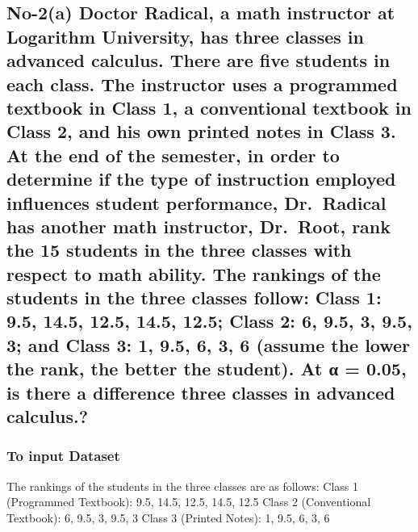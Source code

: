 \documentclass[
]{article}
\begin{document}
\subsection{No-2(a) Doctor Radical, a math instructor at Logarithm
University, has three classes in advanced calculus. There are five
students in each class. The instructor uses a programmed textbook in
Class 1, a conventional textbook in Class 2, and his own printed notes
in Class 3. At the end of the semester, in order to determine if the
type of instruction employed influences student performance, Dr.~Radical
has another math instructor, Dr.~Root, rank the 15 students in the three
classes with respect to math ability. The rankings of the students in
the three classes follow: Class 1: 9.5, 14.5, 12.5, 14.5, 12.5; Class 2:
6, 9.5, 3, 9.5, 3; and Class 3: 1, 9.5, 6, 3, 6 (assume the lower the
rank, the better the student). At α = 0.05, is there a difference three
classes in advanced
calculus.?}\label{no-2a-doctor-radical-a-math-instructor-at-logarithm-university-has-three-classes-in-advanced-calculus.-there-are-five-students-in-each-class.-the-instructor-uses-a-programmed-textbook-in-class-1-a-conventional-textbook-in-class-2-and-his-own-printed-notes-in-class-3.-at-the-end-of-the-semester-in-order-to-determine-if-the-type-of-instruction-employed-influences-student-performance-dr.-radical-has-another-math-instructor-dr.-root-rank-the-15-students-in-the-three-classes-with-respect-to-math-ability.-the-rankings-of-the-students-in-the-three-classes-follow-class-1-9.5-14.5-12.5-14.5-12.5-class-2-6-9.5-3-9.5-3-and-class-3-1-9.5-6-3-6-assume-the-lower-the-rank-the-better-the-student.-at-ux3b1-0.05-is-there-a-difference-three-classes-in-advanced-calculus.}

\subsubsection{To input Dataset}\label{to-input-dataset}

The rankings of the students in the three classes are as follows: Class
1 (Programmed Textbook): 9.5, 14.5, 12.5, 14.5, 12.5 Class 2
(Conventional Textbook): 6, 9.5, 3, 9.5, 3 Class 3 (Printed Notes): 1,
9.5, 6, 3, 6
\end{document}

